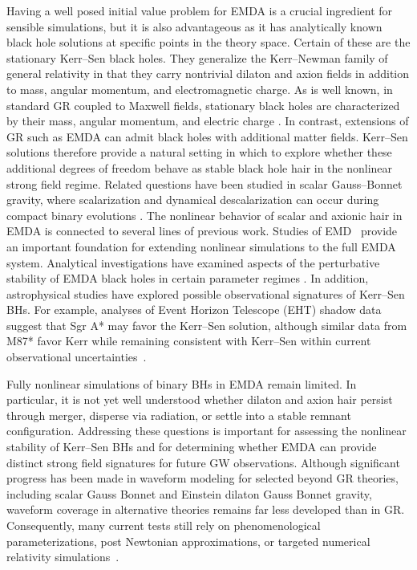 Having a well posed initial value problem for EMDA is a crucial ingredient for sensible simulations, but it is also advantageous as it has analytically known black hole solutions at specific points in the theory space.  Certain of these are the stationary Kerr--Sen black holes.  They generalize the Kerr--Newman family of general relativity in that they carry 
nontrivial dilaton and axion fields in addition to mass, angular momentum,
and electromagnetic charge. As is well known, in standard GR coupled to Maxwell fields,
stationary black holes are characterized by their mass, angular momentum,
and electric charge \cite{Israel1967,Carter1971}. In contrast, extensions
of GR such as EMDA can admit black holes with additional matter fields.
Kerr--Sen solutions therefore
provide a natural setting in which to explore whether these additional degrees of
freedom behave as stable black hole hair in the nonlinear strong field
regime. Related questions have been studied in scalar Gauss--Bonnet gravity,
where scalarization and dynamical descalarization can occur during
compact binary evolutions
\cite{Elley2022,Silva2021DynamicalDescalarization}.
The nonlinear behavior of scalar and axionic hair in EMDA is connected to
several lines of previous work. Studies of EMD~\cite{Julie2017,Hirschmann2018}
provide an important foundation for extending nonlinear simulations to the
full EMDA system. Analytical investigations have examined aspects of the
perturbative stability of EMDA black holes in certain parameter regimes
\cite{PopeRohrerWhiting2025}. In addition, astrophysical studies have
explored possible observational signatures of Kerr--Sen BHs. For example,
analyses of Event Horizon Telescope (EHT) shadow data suggest that Sgr A*
may favor the Kerr--Sen solution, although similar data from M87* favor
Kerr while remaining consistent with Kerr--Sen within current observational
uncertainties~\cite{Sahoo2024PRD,Sahoo2025}.

Fully nonlinear simulations of binary BHs in EMDA remain limited. In particular, it is not yet well understood whether dilaton and axion hair persist through merger, disperse via radiation, or settle into a stable remnant configuration. Addressing these questions is important for assessing the nonlinear stability of Kerr--Sen BHs and for determining whether EMDA can provide distinct strong field signatures for future GW observations.  Although significant progress has been made in waveform modeling for selected beyond GR theories, including scalar Gauss Bonnet and Einstein dilaton Gauss Bonnet gravity, waveform coverage in alternative theories remains far less developed than in GR. Consequently, many current tests still rely on phenomenological parameterizations, post Newtonian approximations, or targeted numerical relativity simulations~\cite{Gasparotto2026MemoryHairyBBH,Agathos2014,Elley2022,Doneva2023sGB}.

